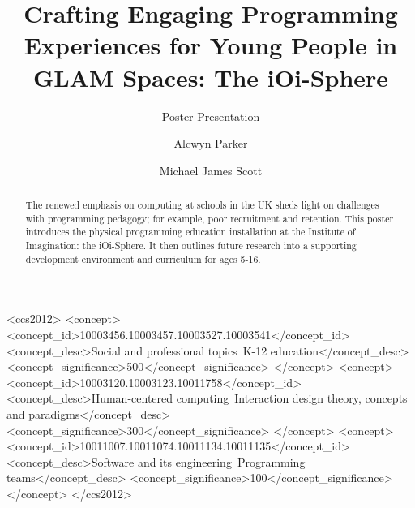 \documentclass[sigconf,screen]{acmart}
\begin{document}
\title{Crafting Engaging Programming Experiences for Young People in GLAM Spaces: The iOi-Sphere}
\subtitle{Poster Presentation}

\author{Alcwyn Parker}

\author{Michael James Scott}

\renewcommand{\shortauthors}{Parker \& Scott}

\begin{abstract}
The renewed emphasis on computing at schools in the UK sheds light on challenges with programming pedagogy; for example, poor recruitment and retention. This poster introduces the  physical programming education installation at the Institute of Imagination: the iOi-Sphere. It then outlines future research into a supporting development environment and curriculum for ages 5-16.
\end{abstract}

%
%
\begin{CCSXML}
<ccs2012>
<concept>
<concept_id>10003456.10003457.10003527.10003541</concept_id>
<concept_desc>Social and professional topics~K-12 education</concept_desc>
<concept_significance>500</concept_significance>
</concept>
<concept>
<concept_id>10003120.10003123.10011758</concept_id>
<concept_desc>Human-centered computing~Interaction design theory, concepts and paradigms</concept_desc>
<concept_significance>300</concept_significance>
</concept>
<concept>
<concept_id>10011007.10011074.10011134.10011135</concept_id>
<concept_desc>Software and its engineering~Programming teams</concept_desc>
<concept_significance>100</concept_significance>
</concept>
</ccs2012>
\end{CCSXML}

\end{document}
